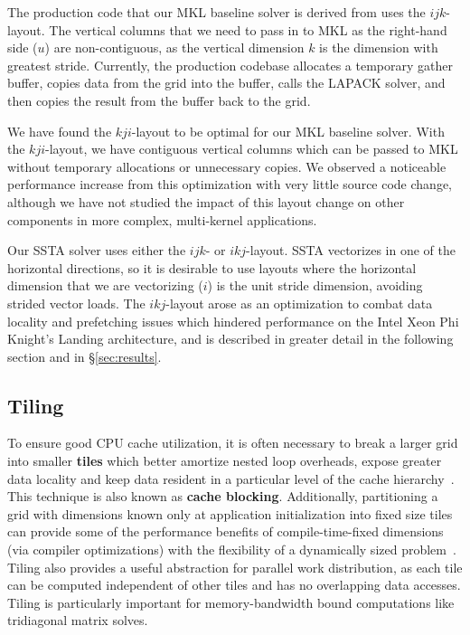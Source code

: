 \documentclass[10pt, conference, compsocconf]{IEEEtran}
\begin{document}
The production code that our MKL baseline solver is derived from uses the
  \(ijk\)-layout.
The vertical columns that we need to pass in to MKL as the right-hand side
  (\(u\)) are non-contiguous, as the vertical dimension \(k\) is the dimension
  with greatest stride.
Currently, the production codebase allocates a temporary gather buffer, copies
  data from the grid into the buffer, calls the LAPACK solver, and then copies
  the result from the buffer back to the grid.

We have found the \(kji\)-layout to be optimal for our MKL baseline solver.
With the \(kji\)-layout, we have contiguous vertical columns which can be
  passed to MKL without temporary allocations or unnecessary copies.
We observed a noticeable performance increase from this optimization with very
  little source code change, although we have not studied the impact of this
  layout change on other components in more complex, multi-kernel applications.

Our SSTA solver uses either the \(ijk\)- or \(ikj\)-layout.
SSTA vectorizes in one of the horizontal directions, so it is
  desirable to use layouts where the horizontal dimension that we are
  vectorizing (\(i\)) is the unit stride dimension, avoiding strided vector loads.
The \(ikj\)-layout arose as an optimization to combat data locality and
  prefetching issues which hindered performance on the Intel Xeon Phi Knight's
  Landing architecture, and is described in greater detail in the following
  section and in \S\ref{sec:results}.

\subsection{Tiling}
\label{sec:impl:tiling}

To ensure good CPU cache utilization, it is often necessary to break a larger
  grid into smaller \textbf{tiles} which better amortize nested loop overheads, expose
  greater data locality and keep data resident in a particular level of the
  cache hierarchy~\cite{cache_blocking}.
This technique is also known as \textbf{cache blocking}.
Additionally, partitioning a grid with dimensions known only at application
  initialization into fixed size tiles can provide some of the performance
  benefits of compile-time-fixed dimensions (via compiler optimizations) with
  the flexibility of a dynamically sized problem~\cite{kokkos}.
Tiling also provides a useful abstraction for parallel work distribution, as
  each tile can be computed independent of other tiles and has no overlapping
  data accesses.
Tiling is particularly important for memory-bandwidth bound computations like
  tridiagonal matrix solves.
\end{document}
